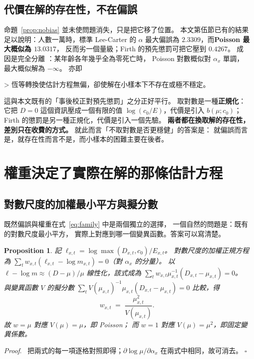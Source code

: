 \documentclass[UTF8, fontset=macnew, a4paper, 12pt]{ctexart}
\newtheorem{prop}{Proposition}
\newenvironment{proof}{\par\noindent\textit{Proof}.\ }{\hfill$\square$\par\vspace{4pt}}
\begin{document}
\subsection{代價在解的存在性，不在偏誤}\label{subsec:existence}

命題~\ref{prop:nobias} 並未使問題消失，只是把它移了位置。
本文第伍節已有的結果足以說明：人數一萬時，標準 Lee-Carter 的
$\alpha$ 最大偏誤為 $2.3309$，而\textbf{Poisson 最大概似為 $13.0317$}，
反而劣一個量級；Firth 的預先懲罰可把它壓到 $0.4267$。
成因是完全分離 \citep{albert1984}：某年齡各年幾乎全為零死亡時，
Poisson 對數概似對 $\alpha_x$ 單調，最大概似解為 $-\infty$。
亦即

> 恆等轉換使估計方程無偏，卻使解在小樣本下不存在或極不穩定。

這與本文既有的「事後校正對預先懲罰」之分正好平行。
取對數是一種\textbf{正規化}：它把 $D=0$ 這個資訊壓成一個有限的值
$\log(c_0/E)$，代價是引入 $b(\mu;c_0)$；
Firth 的懲罰是另一種正規化，代價是引入一個先驗。
\textbf{兩者都在換取解的存在性，差別只在收費的方式。}
就此而言「不取對數是否更穩健」的答案是：
就偏誤而言是，就存在性而言不是，而小樣本的困難主要在後者。

\section{權重決定了實際在解的那條估計方程}\label{sec:quasi}

\subsection{對數尺度的加權最小平方與擬分數}\label{subsec:equiv}

既然偏誤與權重在式~\eqref{eq:family} 中是兩個獨立的選擇，
一個自然的問題是：既有的對數尺度最小平方，
實際上對應到哪一個變異函數。答案可以寫清楚。

\begin{prop}\label{prop:quasi}
記 $\ell_{x,t}=\log\max(D_{x,t},c_0)/E_{x,t}$。
對數尺度的加權正規方程為
$\sum_t w_{x,t}(\ell_{x,t}-\log m_{x,t})=0$（對 $\alpha_x$ 的分量）。
以 $\ell-\log m\approx(D-\mu)/\mu$ 線性化，該式成為
$\sum_t w_{x,t}\mu_{x,t}^{-1}(D_{x,t}-\mu_{x,t})=0$。
與變異函數 $V$ 的擬分數
$\sum_t V(\mu_{x,t})^{-1}\mu_{x,t}(D_{x,t}-\mu_{x,t})=0$
\citep{wedderburn1974,mccullagh1983} 比較，得
$$w_{x,t}\;=\;\frac{\mu_{x,t}^2}{V(\mu_{x,t})} .$$
故 $w=\mu$ 對應 $V(\mu)=\mu$，即 Poisson；
而 $w=1$ 對應 $V(\mu)=\mu^2$，即固定變異係數。
\end{prop}

\begin{proof}
把兩式的每一項逐格對照即得；$\partial\log\mu/\partial\alpha_x$
在兩式中相同，故可消去。
\end{proof}
\end{document}
